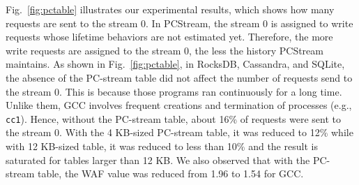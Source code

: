 Fig.~\ref{fig:pctable} illustrates our experimental results, which shows how
many requests are sent to the stream 0. In \textsf{PCStream}, the stream 0 is
assigned to write requests whose lifetime behaviors are not estimated yet.
Therefore, the more write requests are assigned to the stream 0, the less the
history \textsf{PCStream} maintains. As shown in Fig.~\ref{fig:pctable}, in
RocksDB, Cassandra, and SQLite, the absence of the PC-stream table did not
affect the number of requests send to the stream 0. This is because those
programs ran continuously for a long time. Unlike them, GCC involves frequent
creations and termination of processes (e.g., \texttt{cc1}).
Hence, without the PC-stream table, about 16\% of requests were sent to the
stream 0. With the 4 KB-sized PC-stream table, it was reduced to 12\%
while with 12 KB-sized table, it was reduced to less than 10\%
and the result is saturated for tables larger than 12 KB.
We also
observed that with the PC-stream table, the WAF value was reduced from 1.96 to
1.54 for GCC.

